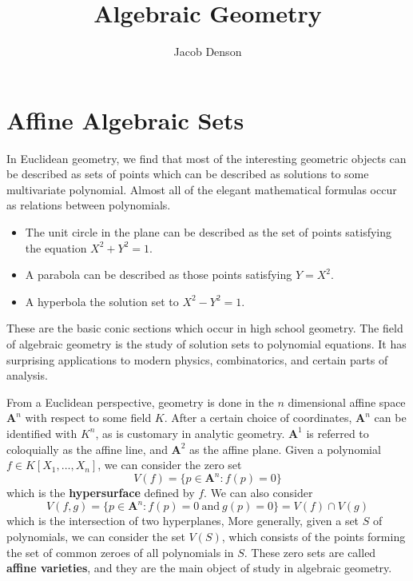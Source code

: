 

\title{Algebraic Geometry}
\author{Jacob Denson}



\maketitle
\tableofcontents
{}

\chapter{Affine Algebraic Sets}

In Euclidean geometry, we find that most of the interesting geometric objects can be described as sets of points which can be described as solutions to some multivariate polynomial. Almost all of the elegant mathematical formulas occur as relations between polynomials.
%
\begin{itemize}
    \item The unit circle in the plane can be described as the set of points satisfying the equation $X^2 + Y^2 = 1$.
    \item A parabola can be described as those points satisfying $Y = X^2$.
    \item A hyperbola the solution set to $X^2 - Y^2 = 1$.
\end{itemize}
%
These are the basic conic sections which occur in high school geometry. The field of algebraic geometry is the study of solution sets to polynomial equations. It has surprising applications to modern physics, combinatorics, and certain parts of analysis.

From a Euclidean perspective, geometry is done in the $n$ dimensional affine space $\mathbf{A}^n$ with respect to some field $K$. After a certain choice of coordinates, $\mathbf{A}^n$ can be identified with $K^n$, as is customary in analytic geometry. $\mathbf{A}^1$ is referred to coloquially as the affine line, and $\mathbf{A}^2$ as the affine plane. Given a polynomial $f \in K[X_1, \dots, X_n]$, we can consider the zero set
%
\[ V(f) = \{ p \in \mathbf{A}^n : f(p) = 0 \} \]
%
which is the {\bf hypersurface} defined by $f$. We can also consider
%
\[ V(f,g) = \{ p \in \mathbf{A}^n: f(p) = 0\ \text{and}\ g(p) = 0 \} = V(f) \cap V(g) \]
%
which is the intersection of two hyperplanes, More generally, given a set $S$ of polynomials, we can consider the set $V(S)$, which consists of the points forming the set of common zeroes of all polynomials in $S$. These zero sets are called {\bf affine varieties}, and they are the main object of study in algebraic geometry.

